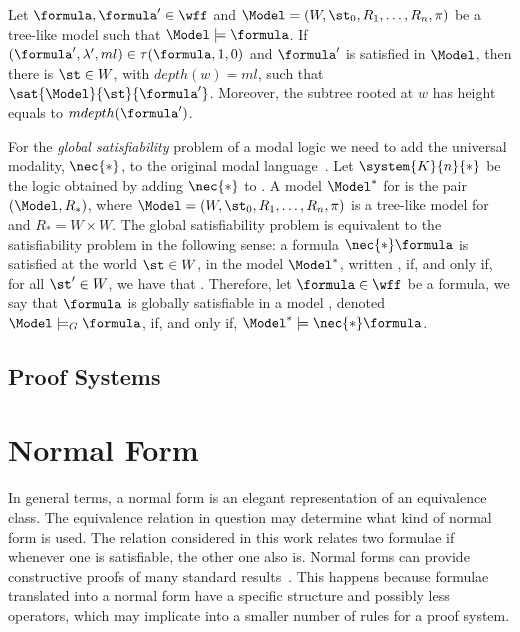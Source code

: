 \begin{example}
    \begin{theorem}
        Let $\formula, \formula' \in \wff$ and $\Model = (W, \st_0, R_1, \ldots,
        R_n, \pi)$ be a tree-like model such that $\Model \models \formula$. If
        $(\formula', \lambda', ml) \in \tau(\formula, 1, 0)$ and
        $\formula'$ is satisfied in $\Model$, then there is $\st \in W$, with
        $depth(w) = ml$, such that $\sat{\Model}{\st}{\formula'}$. Moreover,
        the subtree rooted at $w$ has height equals to $mdepth(\formula')$.
    \end{theorem}
\end{example}

For the \emph{global satisfiability} problem of a modal logic we need to add the
universal modality, $\nec{*}$, to the original modal
language~\cite{goranko1992using}. Let $\system{K}{n}{*}$ be the logic obtained
by adding $\nec{*}$ to . A model $\Model^*$ for 
is the pair $(\Model, R_*)$, where $\Model = (W, \st_0, R_1, \ldots, R_n, \pi)$
is a tree-like model for  and $R_* = W \times W$. The global
satisfiability problem is equivalent to the satisfiability problem in the
following sense: a formula $\nec{*} \formula$ is satisfied at the world $\st \in
W$, in the model $\Model^*$, written \sat{\Model^*}{\st}{\nec{*}\formula}, if,
and only if, for all $\st' \in W$, we have that .
Therefore, let $\formula \in \wff$ be a formula, we say that $\formula$ is
globally satisfiable in a model \Model, denoted $\Model \models_G \formula$, if,
and only if, $\Model^* \models \nec{*} \formula$.

\subsection{Proof Systems} %

\section{Normal Form}

In general terms, a normal form is an elegant representation of an equivalence
class. The equivalence relation in question may determine what kind of normal
form is used. The relation considered in this work relates two formulae if
whenever one is satisfiable, the other one also is.  Normal forms can provide
constructive proofs of many standard results~\cite{fine1975}. This happens
because formulae translated into a normal form have a specific structure and
possibly less operators, which may implicate into a smaller number of rules for
a proof system. 

